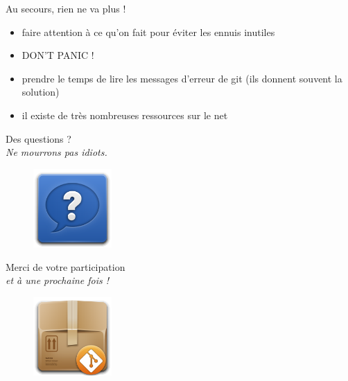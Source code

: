 \documentclass{beamer}
\begin{document}
\begin{frame}{Au secours, rien ne va plus !}
	\begin{itemize}
		\item faire attention à ce qu'on fait pour éviter les ennuis inutiles
		\item DON'T PANIC !
		\item prendre le temps de lire les messages d'erreur de git (ils donnent souvent la solution)
		\item il existe de très nombreuses ressources sur le net
	\end{itemize}
\end{frame}


\begin{frame}
		\begin{center}
 		\Large{Des questions ?}\\
 		{\small \textit{Ne mourrons pas idiots.}}
	\end{center}

	\begin{figure}
		\centering
		\includegraphics[height=3cm]{img/help}
	\end{figure}
\end{frame}


\begin{frame}
		\begin{center}
 		\Large{Merci de votre participation}\\
 		{\small \textit{et à une prochaine fois !}}
	\end{center}

	\begin{figure}
		\centering
		\includegraphics[height=3cm]{img/git_repo}
	\end{figure}
\end{frame}
\end{document}

